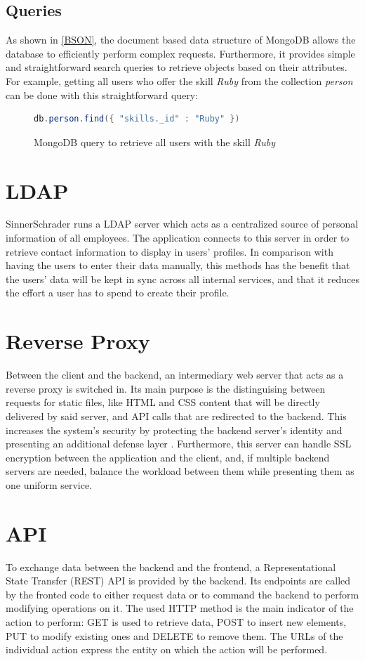 \subsection{Queries}
As shown in \ref{BSON}, the document based data structure of MongoDB allows the database to efficiently perform complex requests. Furthermore, it provides simple and straightforward search queries to retrieve objects based on their attributes. For example, getting all users who offer the skill \textit{Ruby} from the collection \textit{person} can be done with this straightforward query:
\begin{figure}
\begin{lstlisting}[language=Java]
db.person.find({ "skills._id" : "Ruby" })
\end{lstlisting}
\caption[Example Database Query]{MongoDB query to retrieve all users with the skill \textit{Ruby}}
\end{figure}

\section{LDAP}
SinnerSchrader runs a LDAP server which acts as a centralized source of personal information of all employees. The application connects to this server in order to retrieve contact information to display in users' profiles. In comparison with having the users to enter their data manually, this methods has the benefit that the users' data will be kept in sync across all internal services, and that it reduces the effort a user has to spend to create their profile.

\section{Reverse Proxy}
Between the client and the backend, an intermediary web server that acts as a reverse proxy is switched in. Its main purpose is the distinguising between requests for static files, like HTML and CSS content that will be directly delivered by said server, and API calls that are redirected to the backend. This increases the system's security by protecting the backend server's identity and presenting an additional defense layer \cite{NGINX}. Furthermore, this server can handle SSL encryption between the application and the client, and, if multiple backend servers are needed, balance the workload between them while presenting them as one uniform service.

\section{API}
To exchange data between the backend and the frontend, a Representational State Transfer (REST) API is provided by the backend. Its endpoints are called by the fronted code to either request data or to command the backend to perform modifying operations on it.
The used HTTP method is the main indicator of the action to perform: GET is used to retrieve data, POST to insert new elements, PUT to modify existing ones and DELETE to remove them. The URLs of the individual action express the entity on which the action will be performed.

